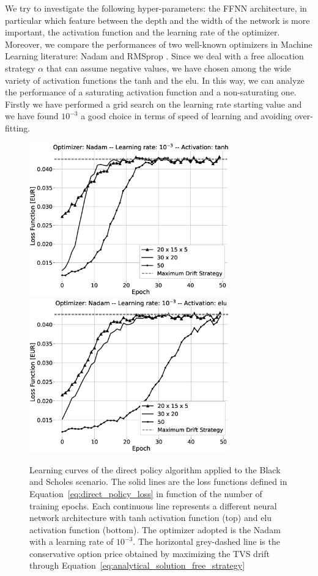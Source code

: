 \documentclass[runningheads]{m2ef}
\newcommand{\change}[1]{{\color{red} {#1}}}%
\begin{document}
We try to investigate the following hyper-parameters: the FFNN architecture, in particular which feature between the depth and the width of the network is more important, the activation function and the learning rate of the optimizer. Moreover, we compare the performances of two well-known optimizers in Machine Learning literature: Nadam \cite{Dozat2016} and RMSprop \cite{Hiton2012}. Since we deal with a free allocation strategy $\alpha$ that can assume negative values, we have chosen among the wide variety of activation functions \change{\cite{Goodfellow2016}} the tanh and the elu. In this way, we can analyze the performance of a saturating activation function and a non-saturating one. Firstly we have performed a grid search on the learning rate starting value and we have found $10^{-3}$ a good choice in terms of speed of learning and avoiding over-fitting.
 \begin{figure}[h!]
	\centering
	\includegraphics[width=3.4in]{BS_fine_tuning_Nadam_tanh_grey.eps}
	\includegraphics[width=3.4in]{BS_fine_tuning_Nadam_elu_grey.eps}
	\caption{Learning curves of the direct policy algorithm applied to the Black and Scholes \change{scenario}. The solid lines are the loss functions defined in Equation~\eqref{eq:direct_policy_loss} in function of the number of training epochs. Each continuous line represents a different neural network architecture with tanh activation function (top) and elu activation function (bottom). The optimizer adopted is the Nadam with a learning rate of $10^{-3}$. The horizontal grey-dashed line is the conservative option price obtained by maximizing the TVS drift through Equation~\eqref{eq:analytical_solution_free_strategy}}
	\label{fig:result_bs_nadam}
\end{figure}  
\end{document}
